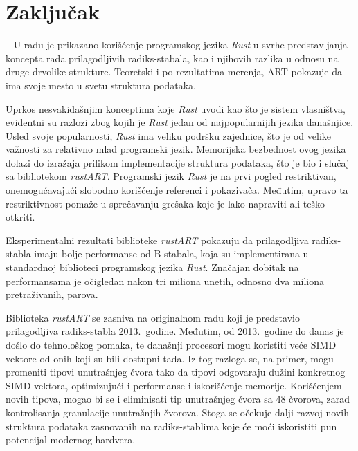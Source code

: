 \documentclass[12pt,oneside]{memoir}
\begin{document}
\chapter{Zaključak}~\label{ch:zakljucak}
U radu je prikazano korišćenje programskog jezika \textit{Rust}
u svrhe predstavljanja koncepta rada prilagodljivih radiks-stabala,
kao i njihovih razlika u odnosu na druge drvolike strukture.
Teoretski i po rezultatima merenja, ART pokazuje da
ima svoje mesto u svetu struktura podataka.

Uprkos nesvakidašnjim konceptima
koje \textit{Rust} uvodi kao što je sistem vlasništva,
evidentni su razlozi zbog kojih je \textit{Rust} jedan od najpopularnijih
jezika današnjice. Usled svoje popularnosti, \textit{Rust}
ima veliku podršku zajednice, što je od velike važnosti za
relativno mlad programski jezik.
Memorijska bezbednost ovog jezika dolazi do izražaja
prilikom implementacije struktura podataka, što je bio i slučaj sa
bibliotekom \textit{rustART}. Programski jezik \textit{Rust} je
na prvi pogled restriktivan, onemogućavajući slobodno korišćenje
referenci i pokazivača. Međutim, upravo ta restriktivnost
pomaže u sprečavanju grešaka koje je lako napraviti ali
teško otkriti.

Eksperimentalni rezultati biblioteke \textit{rustART} pokazuju
da prilagodljiva radiks-stabla imaju bolje performanse od
B-stabala, koja su implementirana u standardnoj biblioteci
programskog jezika \textit{Rust}. Značajan dobitak na performansama
je očigledan nakon tri miliona unetih,
odnosno dva miliona pretraživanih, parova.

Biblioteka \textit{rustART} se zasniva na originalnom radu koji je
predstavio prilagodljiva radiks-stabla 2013.\ godine. Međutim,
od 2013.\ godine do danas je došlo do tehnološkog pomaka,
te današnji procesori mogu koristiti veće SIMD vektore od onih koji
su bili dostupni tada. Iz tog razloga se, na primer, mogu
promeniti tipovi unutrašnjeg čvora tako da tipovi odgovaraju
dužini konkretnog SIMD vektora, optimizujući i performanse
i iskorišćenje memorije.
Korišćenjem novih tipova, mogao bi se i eliminisati tip unutrašnjeg
čvora sa 48 čvorova, zarad kontrolisanja granulacije unutrašnjih čvorova.
Stoga se očekuje dalji razvoj
novih struktura podataka zasnovanih na radiks-stablima
koje će moći iskoristiti pun potencijal modernog hardvera.

\literatura
\end{document}
